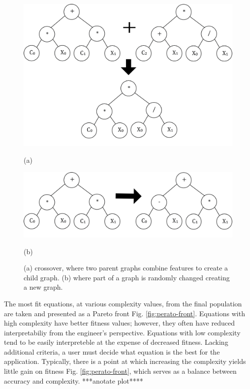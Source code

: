 \begin{figure}
    \centering

    \begin{minipage}{\textwidth}
        \centering
        \includegraphics[width=0.8\linewidth]{geometry_figures/agraph-crossover.png}
        \caption*{(a)}
    \end{minipage}
    
    \begin{minipage}{\textwidth}
        \centering
        \includegraphics[width=0.8\linewidth]{geometry_figures/agraph-mutation.png}
        \caption*{(b)}
    \end{minipage}
    
    \caption{(a) crossover, where two parent graphs combine features to create a child graph. (b) where part of a graph is randomly changed creating a new graph.}
    \label{fig:agraph_cross_mut}
\end{figure}




The most fit equations, at various complexity values, from the final population are taken and presented as a Pareto front Fig. \ref{fig:perato-front}. Equations with high complexity have better fitness values; however, they often have reduced interpretabiliy from the engineer's perspective. Equations with low complexity tend to be easily interpreteble at the expense of decreased fitness. Lacking additional criteria, a user must decide what equation is the best for the application. Typically, there is a point at which increasing the complexity yields little gain on fitness Fig. \ref{fig:perato-front}, which serves as a balance between accuracy and complexity. ***anotate plot****

